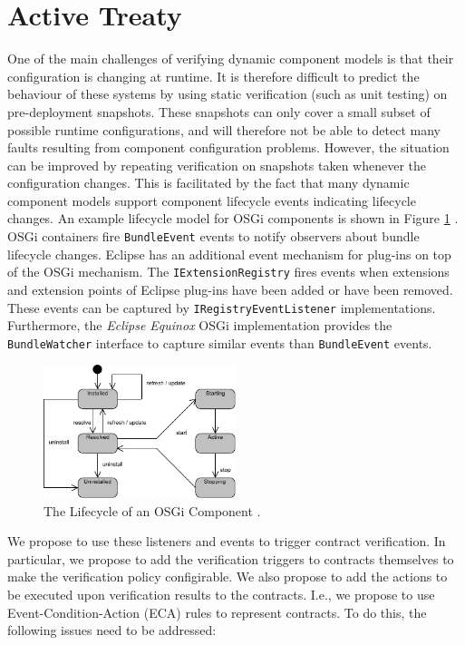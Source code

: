 \documentclass{llncs}
\begin{document}
\section{Active Treaty}
\label{section:activeTreaty}

One of the main challenges of verifying dynamic component models is that their configuration is changing at runtime. It is therefore difficult to predict the behaviour of these systems by using static verification (such as unit testing) on pre-deployment snapshots. These snapshots can only cover a small subset of possible runtime configurations, and will therefore not be able to detect many faults resulting from component configuration problems. However, the situation can 
be improved by repeating verification on snapshots taken whenever the configuration changes. This is facilitated by the fact that many dynamic component models support component lifecycle  events indicating lifecycle changes. 
An example lifecycle model for OSGi components is shown in Figure \ref{fig:osgiStates} \cite{OSGI42Core}. OSGi containers fire \texttt{BundleEvent} events to notify observers about bundle lifecycle changes. Eclipse has an additional event mechanism for plug-ins on top of the OSGi mechanism. The \texttt{IExtensionRegistry} fires events when extensions and extension points of Eclipse plug-ins have been added or have been removed. These events can be captured by \texttt{IRegistryEventListener} implementations. Furthermore, the \textit{Eclipse Equinox} \cite{EclipseEquinox} OSGi implementation provides the \texttt{BundleWatcher} interface to capture similar events than \texttt{BundleEvent} events.

\begin{figure}[b]
  \centering
  \includegraphics[width=0.5\textwidth]{OSGiStates.pdf}
  \caption{The Lifecycle of an OSGi Component \cite{OSGI42Core}.}
  \label{fig:osgiStates}
\end{figure}

We propose to use these listeners and events to trigger contract verification. In particular, we propose to add the verification triggers to contracts themselves to make the verification policy configirable. We also propose to add the actions to be executed 
upon verification results to the contracts. I.e., we propose to use Event-Condition-Action (ECA) rules to represent contracts. To do this, the following issues need to be addressed:
\end{document}
